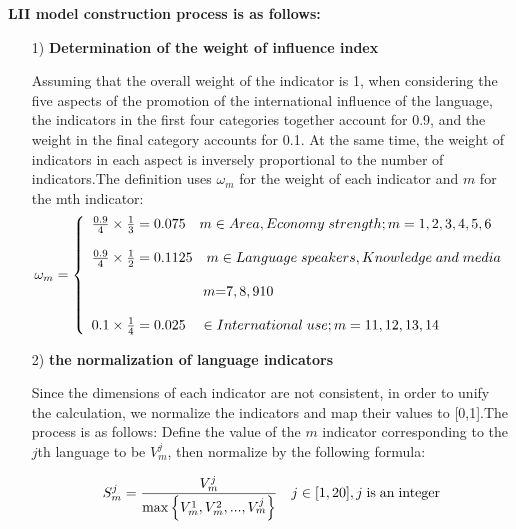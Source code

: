 \par \textbf{LII model construction process is as follows:}

\begin{enumerate}
	\item[1)] \textbf{Determination of the weight of influence index}
	\par Assuming that the overall weight of the indicator is 1, when considering the five aspects of the promotion of the international influence of the language, the indicators in the first four categories together account for 0.9, and the weight in the final category accounts for 0.1. At the same time, the weight of indicators in each aspect is inversely proportional to the number of indicators.The definition uses ${\omega _m}$ for the weight of each indicator and $m$ for the mth indicator:
	\begin{equation}
	{\omega _m} = \left\{ \begin{array}{l}
	\frac{{0.9}}{4} \times \frac{1}{3} = 0.075{\rm{          }} \quad m \in Area,Economy\;{\rm{ }}strength;m = 1,2,3,4,5,6{\rm{   }}\\
	\\
	\frac{{0.9}}{4} \times \frac{1}{2} = 0.1125{\rm{        }}\quad m \in Language\;{\rm{ }}speakers,Knowledge\;{\rm{ }}and\;{\rm{ }}media\\
	\\
	{\rm{                                  }} \quad \quad \quad \quad \quad \quad \quad \quad  m{\rm{ = }}7,8,910\\
	\\
	0.1 \times \frac{1}{4} = 0.025{\rm{           }}\quad \in International\;{\rm{ }}use;m = 11,12,13,14
	\end{array} \right. \label{aa1}
	\end{equation}
	
	\item[2)] \textbf{the normalization of language indicators}
	\par Since the dimensions of each indicator are not consistent, in order to unify the calculation, we normalize the indicators and map their values to [0,1].The process is as follows: Define the value of the $m$ indicator corresponding to the $j$th language to be $V_m^j$, then normalize by the following formula:
	
	\begin{equation}
	S_m^j = \frac{{V_m^j}}{{\max \left\{ {V_m^1,V_m^2,...,V_m^j} \right\}}}{\rm{        }}\quad j \in [1,20],j\;{\rm{ is\; an\; integer}}\label{aa1}
	\end{equation}
	

\end{enumerate}
